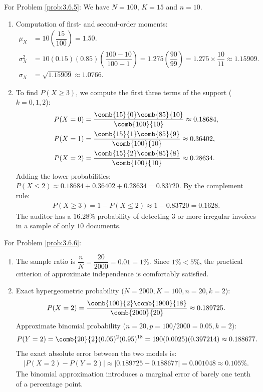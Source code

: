 \begin{solucion}
	\label{sol:3.6.5}
	For Problem \ref{prob:3.6.5}:
	We have $N=100$, $K=15$ and $n=10$.
	\begin{enumerate}
		\item Computation of first- and second-order moments:
		\begin{align*}
			\mu_X &= 10 \left(\dfrac{15}{100}\right) = 1.50. \\
			\sigma_X^2 &= 10(0.15)(0.85)\left(\dfrac{100-10}{100-1}\right) = 1.275 \left(\dfrac{90}{99}\right) = 1.275 \times \dfrac{10}{11} \approx 1.15909. \\
			\sigma_X &= \sqrt{1.15909} \approx 1.0766.
		\end{align*}
		\item To find $P(X \ge 3)$, we compute the first three terms of the support ($k=0, 1, 2$):
		\begin{align*}
			P(X=0) &= \dfrac{\comb{15}{0}\comb{85}{10}}{\comb{100}{10}} \approx 0.18684, \\
			P(X=1) &= \dfrac{\comb{15}{1}\comb{85}{9}}{\comb{100}{10}} \approx 0.36402, \\
			P(X=2) &= \dfrac{\comb{15}{2}\comb{85}{8}}{\comb{100}{10}} \approx 0.28634.
		\end{align*}
		Adding the lower probabilities: $P(X \le 2) \approx 0.18684 + 0.36402 + 0.28634 = 0.83720$.
		By the complement rule:
		\begin{align*}
			P(X \ge 3) = 1 - P(X \le 2) \approx 1 - 0.83720 = 0.1628.
		\end{align*}
		The auditor has a $16.28\%$ probability of detecting $3$ or more irregular invoices in a sample of only $10$ documents.
	\end{enumerate}
\end{solucion}

\begin{solucion}
	\label{sol:3.6.6}
	For Problem \ref{prob:3.6.6}:
	\begin{enumerate}
		\item The sample ratio is $\dfrac{n}{N} = \dfrac{20}{2000} = 0.01 = 1\%$. Since $1\% < 5\%$, the practical criterion of approximate independence is comfortably satisfied.
		\item Exact hypergeometric probability ($N=2000, K=100, n=20, k=2$):
		\begin{align*}
			P(X=2) = \dfrac{\comb{100}{2}\comb{1900}{18}}{\comb{2000}{20}} \approx 0.189725.
		\end{align*}
		Approximate binomial probability ($n=20, p=100/2000=0.05, k=2$):
		\begin{align*}
			P(Y=2) = \comb{20}{2}(0.05)^2(0.95)^{18} = 190(0.0025)(0.397214) \approx 0.188677.
		\end{align*}
		The exact absolute error between the two models is:
		\begin{align*}
			|P(X=2) - P(Y=2)| \approx |0.189725 - 0.188677| = 0.001048 \approx 0.105\%.
		\end{align*}
		The binomial approximation introduces a marginal error of barely one tenth of a percentage point.
	\end{enumerate}
\end{solucion}

